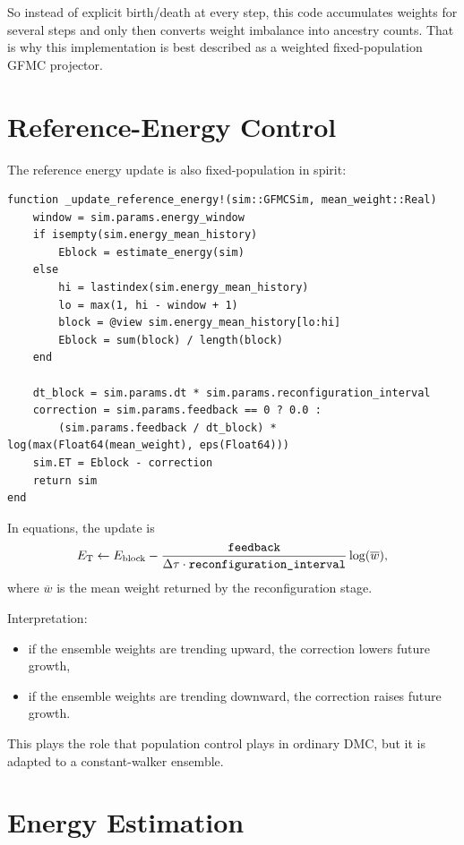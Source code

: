 \documentclass[11pt]{article}
\newcommand{\code}[1]{\texttt{\detokenize{#1}}}
\newcommand{\dtau}{\Delta\tau}
\newcommand{\ET}{E_{\mathrm{T}}}
\begin{document}
So instead of explicit birth/death at every step, this code accumulates weights
for several steps and only then converts weight imbalance into ancestry counts.
That is why this implementation is best described as a weighted fixed-population
GFMC projector.

\section{Reference-Energy Control}

The reference energy update is also fixed-population in spirit:

\begin{lstlisting}[style=codeblock,caption={\code{src/UseCases/gfmc/run.jl}}]
function _update_reference_energy!(sim::GFMCSim, mean_weight::Real)
    window = sim.params.energy_window
    if isempty(sim.energy_mean_history)
        Eblock = estimate_energy(sim)
    else
        hi = lastindex(sim.energy_mean_history)
        lo = max(1, hi - window + 1)
        block = @view sim.energy_mean_history[lo:hi]
        Eblock = sum(block) / length(block)
    end

    dt_block = sim.params.dt * sim.params.reconfiguration_interval
    correction = sim.params.feedback == 0 ? 0.0 :
        (sim.params.feedback / dt_block) * log(max(Float64(mean_weight), eps(Float64)))
    sim.ET = Eblock - correction
    return sim
end
\end{lstlisting}

In equations, the update is
\begin{equation}
\ET \leftarrow E_{\rm block} -
\frac{\texttt{feedback}}{\dtau \cdot \texttt{reconfiguration\_interval}}
\log(\overline w),
\end{equation}
where $\overline w$ is the mean weight returned by the reconfiguration stage.

Interpretation:
\begin{itemize}
    \item if the ensemble weights are trending upward, the correction lowers
    future growth,
    \item if the ensemble weights are trending downward, the correction raises
    future growth.
\end{itemize}

This plays the role that population control plays in ordinary DMC, but it is
adapted to a constant-walker ensemble.

\section{Energy Estimation}
\end{document}
